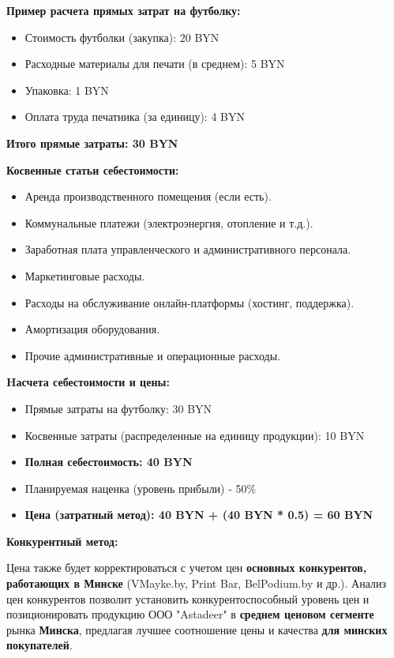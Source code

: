 \textbf{Пример расчета прямых затрат на футболку:}

\begin{itemize}[noitemsep]
    \item Стоимость футболки (закупка): 20 BYN
    \item Расходные материалы для печати (в среднем): 5 BYN
    \item Упаковка: 1 BYN
    \item Оплата труда печатника (за единицу): 4 BYN
\end{itemize}

\textbf{Итого прямые затраты: 30 BYN}

\vspace{0.3cm}

\textbf{Косвенные статьи себестоимости:}

\begin{itemize}[noitemsep]
\item Аренда производственного помещения (если есть).
\item Коммунальные платежи (электроэнергия, отопление и т.д.).
\item Заработная плата управленческого и административного персонала.
\item Маркетинговые расходы.
\item Расходы на обслуживание онлайн-платформы (хостинг, поддержка).
\item Амортизация оборудования.
\item Прочие административные и операционные расходы.
\end{itemize}

\textbf{Hасчета себестоимости и цены:}

\begin{itemize}[noitemsep]
\item Прямые затраты на футболку: 30 BYN
\item Косвенные затраты (распределенные на единицу продукции): 10 BYN
\item \textbf{Полная себестоимость: 40 BYN}
\item Планируемая наценка (уровень прибыли) - 50\%
\item \textbf{Цена (затратный метод): 40 BYN + (40 BYN * 0.5) = 60 BYN}
\end{itemize}

\textbf{Конкурентный метод:}

Цена также будет корректироваться с учетом цен \textbf{основных конкурентов, работающих в Минске} (VMayke.by, Print Bar, BelPodium.by и др.).  Анализ цен конкурентов позволит установить конкурентоспособный уровень цен и позиционировать продукцию ООО "Astadeer" в \textbf{среднем ценовом сегменте} рынка \textbf{Минска}, предлагая лучшее соотношение цены и качества \textbf{для минских покупателей}.

